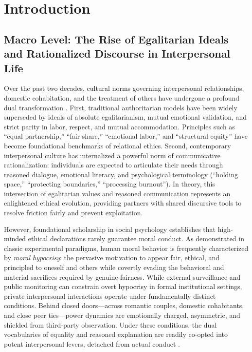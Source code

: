 \section{Introduction}

\subsection{Macro Level: The Rise of Egalitarian Ideals and Rationalized Discourse in Interpersonal Life}
Over the past two decades, cultural norms governing interpersonal relationships, domestic cohabitation, and the treatment of others have undergone a profound dual transformation \citep{swales1990genre,grossmann2023ai}. First, traditional authoritarian models have been widely superseded by ideals of absolute egalitarianism, mutual emotional validation, and strict parity in labor, respect, and mutual accommodation. Principles such as ``equal partnership,'' ``fair share,'' ``emotional labor,'' and ``structural equity'' have become foundational benchmarks of relational ethics. Second, contemporary interpersonal culture has internalized a powerful norm of communicative rationalization: individuals are expected to articulate their needs through reasoned dialogue, emotional literacy, and psychological terminology (``holding space,'' ``protecting boundaries,'' ``processing burnout''). In theory, this intersection of egalitarian values and reasoned communication represents an enlightened ethical evolution, providing partners with shared discursive tools to resolve friction fairly and prevent exploitation.

However, foundational scholarship in social psychology establishes that high-minded ethical declarations rarely guarantee moral conduct. As \citet{batson1997unmasking,batson1999moral} demonstrated in classic experimental paradigms, human moral behavior is frequently characterized by \textit{moral hypocrisy}: the pervasive motivation to appear fair, ethical, and principled to oneself and others while covertly evading the behavioral and material sacrifices required by genuine fairness. While external surveillance and public monitoring can constrain overt hypocrisy in formal institutional settings, private interpersonal interactions operate under fundamentally distinct conditions. Behind closed doors—across romantic couples, domestic cohabitants, and close peer ties—power dynamics are emotionally charged, asymmetric, and shielded from third-party observation. Under these conditions, the dual vocabularies of equality and reasoned explanation are readily co-opted into potent interpersonal levers, detached from actual conduct \citep{cerulli2026dark}.

